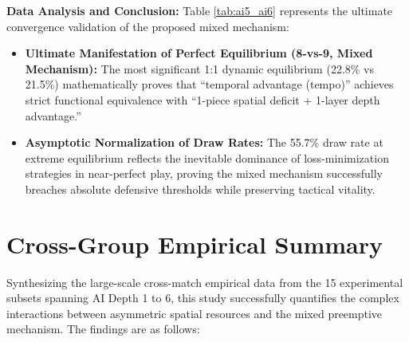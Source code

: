 \textbf{Data Analysis and Conclusion:} 
Table \ref{tab:ai5_ai6} represents the ultimate convergence validation of the proposed mixed mechanism:
\begin{itemize}
    \item \textbf{Ultimate Manifestation of Perfect Equilibrium (8-vs-9, Mixed Mechanism):} The most significant 1:1 dynamic equilibrium (22.8\% vs 21.5\%) mathematically proves that ``temporal advantage (tempo)'' achieves strict functional equivalence with ``1-piece spatial deficit + 1-layer depth advantage.''
    \item \textbf{Asymptotic Normalization of Draw Rates:} The 55.7\% draw rate at extreme equilibrium reflects the inevitable dominance of loss-minimization strategies in near-perfect play, proving the mixed mechanism successfully breaches absolute defensive thresholds while preserving tactical vitality.
\end{itemize}

\section{Cross-Group Empirical Summary}
\label{subsec:empirical_summary}

Synthesizing the large-scale cross-match empirical data from the 15 experimental subsets spanning AI Depth 1 to 6, this study successfully quantifies the complex interactions between asymmetric spatial resources and the mixed preemptive mechanism.  The findings are as follows:

